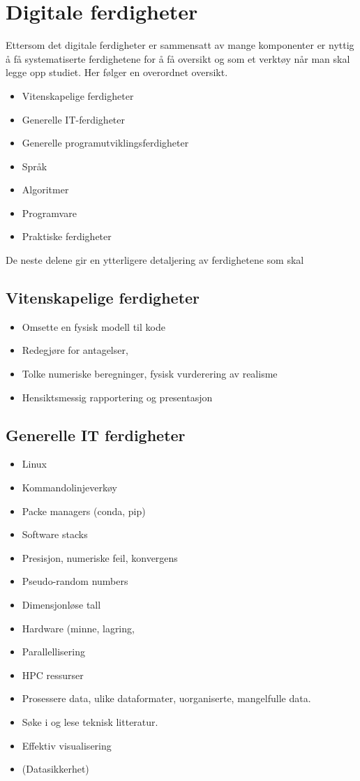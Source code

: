 \section{Digitale ferdigheter}

Ettersom det digitale ferdigheter er sammensatt av mange komponenter er nyttig å få systematiserte ferdighetene for å få oversikt og som et verktøy når man skal legge opp studiet. Her følger en overordnet oversikt.

\begin{itemize}
	\item Vitenskapelige ferdigheter
	\item Generelle IT-ferdigheter
	\item Generelle programutviklingsferdigheter
	\item Språk
	\item Algoritmer
	\item Programvare
	\item Praktiske ferdigheter
\end{itemize}

De neste delene gir en ytterligere detaljering av ferdighetene som skal 

\subsection{Vitenskapelige ferdigheter}
\begin{itemize}
	\item Omsette en fysisk modell til kode
	\item Redegjøre for antagelser, 
	\item Tolke numeriske beregninger, fysisk vurderering av realisme
	\item Hensiktsmessig rapportering og presentasjon
\end{itemize}

\subsection{Generelle IT ferdigheter}
\begin{itemize}
	\item Linux
	\item Kommandolinjeverkøy
	\item Packe managers (conda, pip)
	\item Software stacks
	\item Presisjon, numeriske feil, konvergens
	\item Pseudo-random numbers
	\item Dimensjonløse tall
	\item Hardware (minne, lagring, 
	\item Parallellisering
	\item HPC ressurser
	\item Prosessere data, ulike dataformater, uorganiserte, mangelfulle data.
	\item Søke i og lese teknisk litteratur.
	\item Effektiv visualisering
	\item (Datasikkerhet)
\end{itemize}

